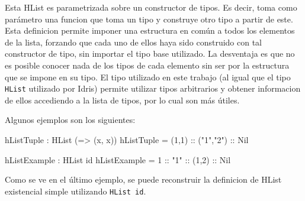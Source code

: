 Esta HList es parametrizada sobre un constructor de tipos. Es decir, toma como parámetro una funcion que toma un tipo y construye otro tipo a partir de este. Esta definicion permite imponer una estructura en común a todos los elementos de la lista, forzando que cada uno de ellos haya sido construido con tal constructor de tipo, sin importar el tipo base utilizado.
La desventaja es que no es posible conocer nada de los tipos de cada elemento sin ser por la estructura que se impone en su tipo. El tipo utilizado en este trabajo (al igual que el tipo \texttt{HList} utilizado por Idris) permite utilizar tipos arbitrarios y obtener informacion de ellos accediendo a la lista de tipos, por lo cual son más útiles.

Algunos ejemplos son los siguientes:

\begin{code}
hListTuple : HList (\x => (x, x))
hListTuple = (1,1) :: ("1","2") :: Nil

hListExample : HList id
hListExample = 1 :: "1" :: (1,2) :: Nil
\end{code}

Como se ve en el último ejemplo, se puede reconstruir la definicion de HList existencial simple utilizando \texttt{HList id}.
